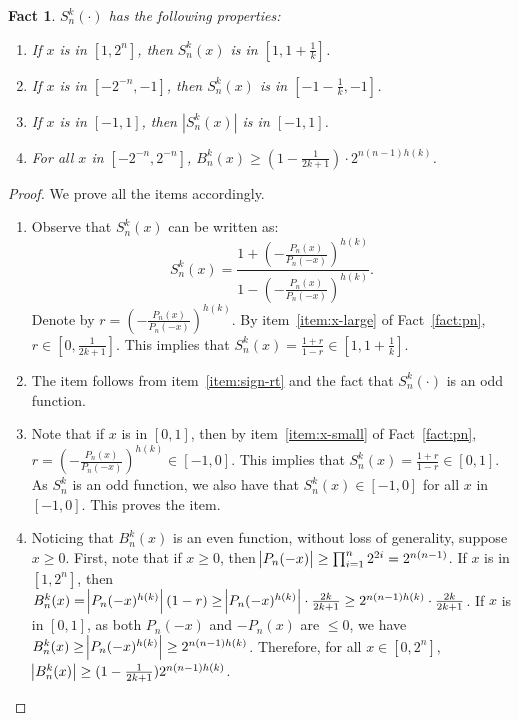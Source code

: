\documentclass{article}
\newtheorem{fact}[theorem]{Fact}
\begin{document}
\begin{fact}
$S_n^k(\cdot)$ has the following properties:
\begin{enumerate}
\item If $x$ is in $[1, 2^n]$, then $S_n^k(x)$ is in $[1, 1 + \frac 1 k]$. \label{item:sign-rt}
\item If $x$ is in $[-2^{-n}, -1]$, then $S_n^k(x)$ is in $[-1 - \frac 1 k, -1]$. \label{item:sign-lt}
\item If $x$ is in $[-1, 1]$, then $|S_n^k(x)|$ is in $[-1, 1]$. \label{item:sign-mid}
\item For all $x$ in $[-2^{-n}, 2^{-n}]$, $B_n^k(x) \geq (1-\frac{1}{2k+1}) \cdot 2^{n(n-1)h(k)}$. \label{item:sign-denom}
\end{enumerate}
\label{fact:newman}
\end{fact}
\begin{proof}
We prove all the items accordingly.
\begin{enumerate}
\item Observe that $S_n^k(x)$ can be written as:
\[ S_n^k(x) = \frac{1 + (-\frac{P_n(x)}{P_n(-x)})^{h(k)}}{ 1 - (-\frac{P_n(x)}{P_n(-x)})^{h(k)} }.  \]
Denote by $r = (-\frac{P_n(x)}{P_n(-x)})^{h(k)}$. By item~\ref{item:x-large} of Fact~\ref{fact:pn}, $r \in [0, \frac{1}{2k+1}]$. This implies that
$S_n^k(x) = \frac{1+r}{1-r} \in [1, 1 + \frac 1 k]$.

\item The item follows from item~\ref{item:sign-rt} and the fact that $S_n^k(\cdot)$ is an odd function.

\item Note that if $x$ is in $[0, 1]$, then by item~\ref{item:x-small} of Fact~\ref{fact:pn}, $r = (-\frac{P_n(x)}{P_n(-x)})^{h(k)} \in [-1, 0]$. This implies that $S_n^k(x) = \frac{1+r}{1-r} \in [0,1]$. As $S_n^k$ is an odd function, we also have that $S_n^k(x) \in [-1, 0]$ for all $x$ in $[-1, 0]$. This proves the item.

\item Noticing that $B_n^k(x)$ is an even function, without loss of generality, suppose $x \geq 0$.
First, note that if $x \geq 0$, then $\abs{P_n(-x)} \geq \prod_{i=1}^n 2^{2i} = 2^{n(n-1)}$.
If $x$ is in $[1,2^n]$, then $B_n^k(x) = \abs{P_n(-x)^{h(k)}} (1 - r) \geq \abs{P_n(-x)^{h(k)}} \cdot \frac{2k}{2k+1} \geq 2^{n(n-1)h(k)} \cdot \frac{2k}{2k+1}$.
If $x$ is in $[0,1]$, as both $P_n(-x)$ and $-P_n(x)$ are $\leq 0$, we have $B_n^k(x) \geq \abs{P_n(-x)^{h(k)}} \geq 2^{n(n-1)h(k)}$. Therefore, for all $x \in [0,2^n]$,
$\abs{B_n^k(x)} \geq (1-\frac{1}{2k+1}) 2^{n(n-1)h(k)}$.
\end{enumerate}
\end{proof}
\end{document}
